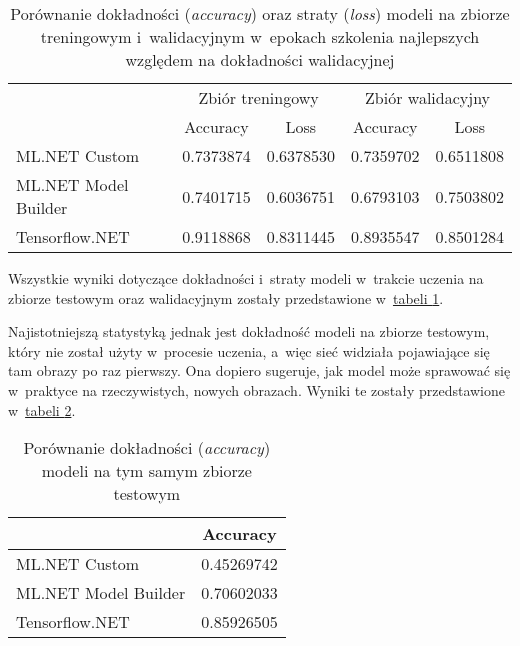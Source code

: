\begin{table}[ht]
  \centering
  \begin{tabular}{|l|r|r|r|r|}
    \hline
                         & \multicolumn{2}{c|}{Zbiór treningowy}                                          & \multicolumn{2}{c|}{Zbiór walidacyjny}                      \\
    \cline{2-5}
                         & \multicolumn{1}{|c|}{Accuracy}        & \multicolumn{1}{|c|}{Loss}             & \multicolumn{1}{|c|}{Accuracy} & \multicolumn{1}{|c|}{Loss} \\
    \hline
    ML.NET Custom        & 0.7373874                             & 0.6378530                              & 0.7359702                      & 0.6511808                  \\
    ML.NET Model Builder & 0.7401715                             & 0.6036751                              & 0.6793103                      & 0.7503802                  \\
    Tensorflow.NET       & 0.9118868                             & 0.8311445                              & 0.8935547                      & 0.8501284                  \\
    \hline
  \end{tabular}
  \caption[Porównanie dokładności oraz straty modeli na zbiorze treningowym i~walidacyjnym]{Porównanie dokładności (\emph{accuracy}) oraz straty (\emph{loss}) modeli na zbiorze treningowym i~walidacyjnym w~epokach szkolenia najlepszych względem na dokładności walidacyjnej}
  \label{tab:train_validation_metric_comparison}
\end{table}

Wszystkie wyniki dotyczące dokładności i~straty modeli w~trakcie uczenia na zbiorze testowym oraz walidacyjnym zostały przedstawione w~\hyperref[tab:train_validation_metric_comparison]{tabeli \ref*{tab:train_validation_metric_comparison}}.

Najistotniejszą statystyką jednak jest dokładność modeli na zbiorze testowym, który nie został użyty w~procesie uczenia, a~więc sieć widziała pojawiające się tam obrazy po raz pierwszy.
Ona dopiero sugeruje, jak model może sprawować się w~praktyce na rzeczywistych, nowych obrazach.
Wyniki te zostały przedstawione w~\hyperref[tab:test_accuracy_comparison]{tabeli \ref*{tab:test_accuracy_comparison}}.

\begin{table}[ht]
  \centering
  \begin{tabular}{|l|r|}
    \hline
                         & \multicolumn{1}{|c|}{Accuracy} \\
    \hline
    ML.NET Custom        & 0.45269742                     \\
    ML.NET Model Builder & 0.70602033                     \\
    Tensorflow.NET       & 0.85926505                     \\
    \hline
  \end{tabular}
  \caption[Porównanie dokładności modeli na tym samym zbiorze testowym]{Porównanie dokładności (\emph{accuracy}) modeli na tym samym zbiorze testowym}
  \label{tab:test_accuracy_comparison}
\end{table}

